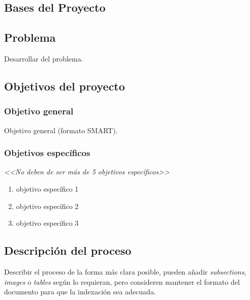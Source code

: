 \documentclass[12pt,letterpaper]{report}
\begin{document}
	\caratula
	\newpage
	\clearpage
	\pagestyle{empty}
		
	\configurarIndices
	\tableofcontents
	\thispagestyle{empty}
	\newpage
	\listoffigures
	\thispagestyle{empty}
	\newpage
	\listoftables
	\thispagestyle{empty}
	\newpage
	
	\iniciarNumeracion
	\renewcommand{\thesection}{\arabic{section}}
	\begin{center}
		\section{Bases del Proyecto}
	\end{center}
	\subsection{Problema}
	Desarrollar del problema.
	\subsection{Objetivos del proyecto}
	\subsubsection{Objetivo general}
	Objetivo general (formato SMART).
	\subsubsection{Objetivos específicos}
	\textit{<<No deben de ser más de 5 objetivos específicos>>}
	\begin{enumerate}
		\item objetivo específico 1
		\item objetivo específico 2
		\item objetivo específico 3
	\end{enumerate}
	\subsection{Descripción del proceso}
	Describir el proceso de la forma más clara posible, pueden añadir \textit{subsections}, \textit{images} o \textit{tables} según lo requieran, pero consideren mantener el formato del documento para que la indexación sea adecuada.
\end{document}
